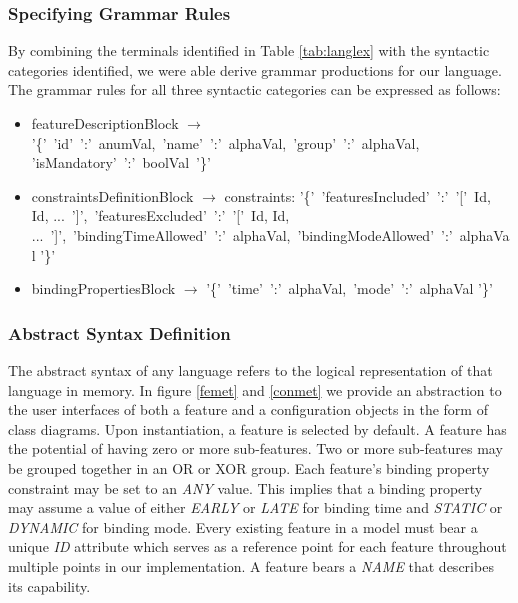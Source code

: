\documentclass[conference]{IEEEtran}
\begin{document}
\subsubsection{Specifying Grammar Rules} By combining the terminals identified in Table \ref{tab:langlex} with the syntactic categories identified, we were able derive grammar productions for our language. The grammar rules for all three syntactic categories can be expressed as follows:\\

\begin{itemize}
	\item[] featureDescriptionBlock $\longrightarrow$ '\{'\ 'id'\ ':'\ anumVal,\ 'name'\ ':'\ alphaVal,\ 'group'\ ':'\ alphaVal, 'isMandatory'\ ':'\ boolVal\ '\}' \\
	
	\item[] constraintsDefinitionBlock $\longrightarrow$ constraints: '\{'\ 'featuresIncluded'\ ':'\ '['\ Id, Id, ...\ ']',\ 'featuresExcluded'\ ':'\ '['\ Id, Id, ...\ ']',\ 'bindingTimeAllowed'\ ':'\ alphaVal,\ 'bindingModeAllowed'\ ':'\ alphaVal '\}'\\
	
	\item[] bindingPropertiesBlock $\longrightarrow$ '\{'\ 'time'\ ':'\ alphaVal,\ 'mode'\ ':'\ alphaVal '\}'\\
\end{itemize}

\subsubsection{Abstract Syntax Definition}
The abstract syntax of any language refers to the logical representation of that language in memory. In figure \ref{femet} and \ref{conmet} we provide an abstraction to the user interfaces of both a feature and a configuration objects in the form of class diagrams. Upon instantiation, a feature is selected by default. A feature has the potential of having zero or more sub-features. Two or more sub-features may be grouped together in an OR or XOR group. Each feature's binding property constraint may be set to an \textit{ANY} value. This implies that a binding property may assume a value of either \textit{EARLY} or \textit{LATE} for binding time and \textit{STATIC} or \textit{DYNAMIC} for binding mode. Every existing feature in a model must bear a unique \textit{ID} attribute which serves as a reference point for each feature throughout multiple points in our implementation. A feature bears a \textit{NAME} that describes its capability. 
\end{document}
